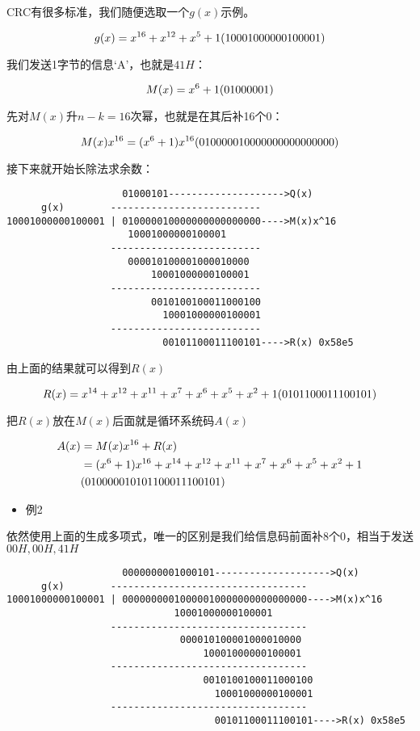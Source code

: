\documentclass[
]{article}
\begin{document}
CRC有很多标准，我们随便选取一个$g(x)$示例。

$$
g(x)=x^{16}+x^{12}+x^5+1\\
(10001000000100001)
$$

我们发送1字节的信息`A'，也就是$41H$：

$$
M(x)=x^6+1\\
(01000001)
$$

先对$M(x)$升$n-k=16$次幂，也就是在其后补16个0：

$$
M(x)x^{16}=(x^6+1)x^{16}\\
(010000010000000000000000)
$$

接下来就开始长除法求余数：

\begin{verbatim}
                    01000101-------------------->Q(x)
      g(x)        --------------------------
10001000000100001 | 010000010000000000000000---->M(x)x^16
                     10001000000100001
                  --------------------------
                     000010100001000010000
                         10001000000100001
                  --------------------------
                         0010100100011000100
                           10001000000100001
                  --------------------------
                           00101100011100101---->R(x) 0x58e5
\end{verbatim}

由上面的结果就可以得到$R(x)$

$$
R(x)=x^{14}+x^{12}+x^{11}+x^{7}+x^{6}+x^{5}+x^{2}+1\\
(0101100011100101)
$$

把$R(x)$放在$M(x)$后面就是循环系统码$A(x)$

\begin{align}
A(x)&=M(x)x^{16}+R(x)\\
&=(x^6+1)x^{16}+x^{14}+x^{12}+x^{11}+x^{7}+x^{6}+x^{5}+x^{2}+1\\
&(01000001 \space 0101100011100101)
\end{align}

\begin{itemize}
\item
  例2
\end{itemize}

依然使用上面的生成多项式，唯一的区别是我们给信息码前面补8个0，相当于发送$00H,00H,41H$

\begin{verbatim}
                    0000000001000101-------------------->Q(x)
      g(x)        ----------------------------------
10001000000100001 | 00000000010000010000000000000000---->M(x)x^16
                             10001000000100001
                  ----------------------------------
                              000010100001000010000
                                  10001000000100001
                  ----------------------------------
                                  0010100100011000100
                                    10001000000100001
                  ----------------------------------
                                    00101100011100101---->R(x) 0x58e5
\end{verbatim}
\end{document}
